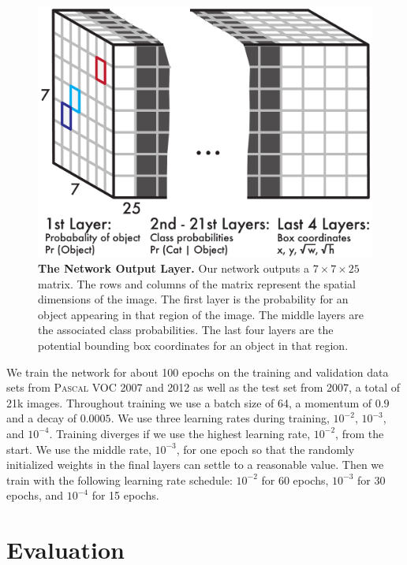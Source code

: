 \documentclass{article} %
\begin{document}
\begin{figure}[h]
\begin{center}
        \includegraphics[width=.9\linewidth]{matrix}
\end{center}
   \caption{\textbf{The Network Output Layer.} Our network outputs a $7 \times 7 \times 25$ matrix. The rows and columns of the matrix represent the spatial dimensions of the image. The first layer is the probability for an object appearing in that region of the image. The middle layers are the associated class probabilities. The last four layers are the potential bounding box coordinates for an object in that region.} 
\label{matrix}
\end{figure}

We train the network for about 100 epochs on the training and validation data sets from \textsc{Pascal} VOC 2007 and 2012 as well as the test set from 2007, a total of 21k images. Throughout training we use a batch size of 64, a momentum of $0.9$ and a decay of $0.0005$. We use three learning rates during training, $10^{-2}$, $10^{-3}$, and $10^{-4}$. Training diverges if we use the highest learning rate, $10^{-2}$, from the start. We use the middle rate, $10^{-3}$, for one epoch so that the randomly initialized weights in the final layers can settle to a reasonable value. Then we train with the following learning rate schedule: $10^{-2}$ for 60 epochs, $10^{-3}$ for 30 epochs, and $10^{-4}$ for 15 epochs.

\section{Evaluation}
\end{document}
